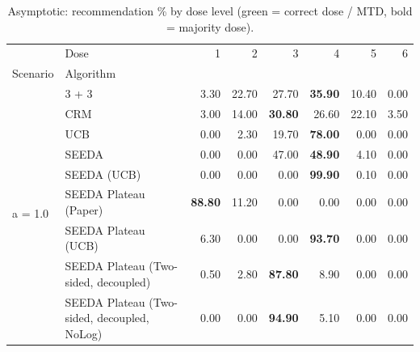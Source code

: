 \begin{table}[H]
\centering
\caption{Asymptotic: recommendation \% by dose level (green = correct dose / MTD, bold = majority dose).}
\label{tab:asym_rec_by_dose}
\begin{tabular}{llrrrrrr}
\toprule
 & Dose & 1 & 2 & 3 & 4 & 5 & 6 \\
Scenario & Algorithm &  &  &  &  &  &  \\
\midrule
\multirow[c]{9}{*}{a = 1.0} & 3 + 3 & 3.30 & 22.70 & {\cellcolor[HTML]{C8E6C9}} 27.70 & \bfseries 35.90 & 10.40 & 0.00 \\
 & CRM & 3.00 & 14.00 & {\cellcolor[HTML]{C8E6C9}} \bfseries 30.80 & 26.60 & 22.10 & 3.50 \\
 & UCB & 0.00 & 2.30 & {\cellcolor[HTML]{C8E6C9}} 19.70 & \bfseries 78.00 & 0.00 & 0.00 \\
 & SEEDA & 0.00 & 0.00 & {\cellcolor[HTML]{C8E6C9}} 47.00 & \bfseries 48.90 & 4.10 & 0.00 \\
 & SEEDA (UCB) & 0.00 & 0.00 & {\cellcolor[HTML]{C8E6C9}} 0.00 & \bfseries 99.90 & 0.10 & 0.00 \\
 & SEEDA Plateau (Paper) & \bfseries 88.80 & 11.20 & {\cellcolor[HTML]{C8E6C9}} 0.00 & 0.00 & 0.00 & 0.00 \\
 & SEEDA Plateau (UCB) & 6.30 & 0.00 & {\cellcolor[HTML]{C8E6C9}} 0.00 & \bfseries 93.70 & 0.00 & 0.00 \\
 & SEEDA Plateau (Two-sided, decoupled) & 0.50 & 2.80 & {\cellcolor[HTML]{C8E6C9}} \bfseries 87.80 & 8.90 & 0.00 & 0.00 \\
 & SEEDA Plateau (Two-sided, decoupled, NoLog) & 0.00 & 0.00 & {\cellcolor[HTML]{C8E6C9}} \bfseries 94.90 & 5.10 & 0.00 & 0.00 \\
\bottomrule
\end{tabular}
\end{table}
